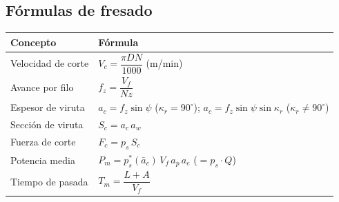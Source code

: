 \documentclass[12pt,a4paper]{article}
\begin{document}
\subsection{Fórmulas de fresado}
\begin{center}
	\small
	\begin{tabular}{@{}ll@{}}
		\toprule
		\textbf{Concepto}  & \textbf{Fórmula}
		\\
		\midrule
		Velocidad de corte & $V_c = \dfrac{\pi D N}{1000}$ (m/min)
		\\[6pt]
		Avance por filo    & $f_z = \dfrac{V_f}{N z}$
		\\[6pt]
		Espesor de viruta  & $a_c = f_z\sin\psi$ ($\kappa_r = 90^\circ$); $a_c =
			                                                                  f_z\sin\psi\sin\kappa_r$
		($\kappa_r \ne 90^\circ$)
		\\[3pt]
		Sección de viruta  & $S_c = a_c\, a_w$
		\\[3pt]
		Fuerza de corte    & $F_c = p_s\, S_c$
		\\[3pt]
		Potencia media     & $P_m = p_s^*(\bar a_c)\, V_f\, a_p\, a_e$ ($=p_s\cdot
			                                                                Q$)
		\\[3pt]
		Tiempo de pasada   & $T_m = \dfrac{L + A}{V_f}$
		\\
		\bottomrule
	\end{tabular}
\end{center}
\end{document}
